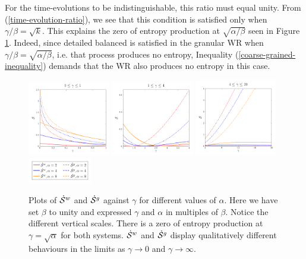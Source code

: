 For the time-evolutions to be indistinguishable, this ratio must equal unity. From (\ref{time-evolution-ratio}), we see that this condition is satisfied only when $\gamma/\beta = \sqrt{k}$. This explains the zero of entropy production at $\sqrt{\alpha/\beta}$ seen in Figure \ref{fig:CG_waiting_room_entropy_prod}. Indeed, since detailed balanced is satisfied in the granular WR  when $\gamma/\beta = \sqrt{\alpha/\beta}$, i.e. that process produces no entropy, Inequality (\ref{coarse-grained-inequality}) demands that the WR also produces no entropy in this case.

\begin{figure}
\centering
\includegraphics[width=0.32\textwidth]{figures/waiting_room_ent1.pdf}
%
\includegraphics[width=0.32\textwidth]{figures/waiting_room_ent2.pdf}
%
\includegraphics[width=0.32\textwidth]{figures/waiting_room_ent3.pdf}
%
\includegraphics[width = 0.25\textwidth]{figures/waiting_room_entLegend.png}
\caption{\footnotesize Plots of $\dot{\mathcal{S}}^w$ and $\dot{\mathcal{S}}^g$ against $\gamma$ for different values of $\alpha$. Here we have set $\beta$ to unity and expressed $\gamma$ and $\alpha$ in multiples of $\beta$. Notice the different vertical scales. There is a zero of entropy production at $\gamma = \sqrt{\alpha}$ for both systems. $\dot{\mathcal{S}}^w$ and $\dot{\mathcal{S}}^g$ display qualitatively different behaviours in the limits as $\gamma \rightarrow 0$ and $\gamma \rightarrow \infty$.}
\label{fig:CG_waiting_room_entropy_prod}
\end{figure}

